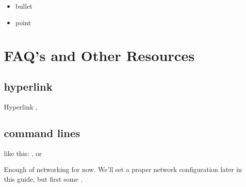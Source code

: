 \documentclass[letterpaper,10pt,english]{sphinxmanual}
\begin{document}
\begin{itemize}
\item {} 
bullet

\item {} 
point

\end{itemize}


\section{FAQ’s and Other Resources}
\label{\detokenize{faq:faq-s-and-other-resources}}\label{\detokenize{faq::doc}}

\subsection{hyperlink}
\label{\detokenize{faq:hyperlink}}
Hyperlink ,


\subsection{command lines}
\label{\detokenize{faq:command-lines}}
like this: ,  or

Enough of networking for now. We’ll set a proper network configuration later in this guide, but first some .
\end{document}
